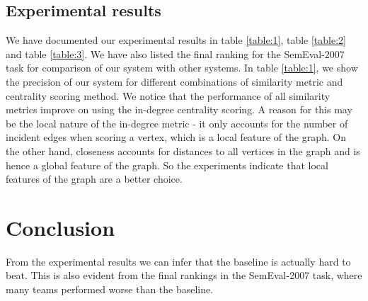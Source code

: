 \documentclass[12pt,letterpaper]{article}
\begin{document}
\subsection{Experimental results}
We have documented our experimental results in table \ref{table:1}, table \ref{table:2} and table \ref{table:3}. We have also listed the final ranking for the SemEval-2007 task for comparison of our system with other systems. In table \ref{table:1}, we show the precision of our system for different combinations of similarity metric and centrality scoring method. We notice that the performance of all similarity metrics improve on using the in-degree centrality scoring. A reason for this may be the local nature of the in-degree metric - it only accounts for the number of incident edges when scoring a vertex, which is a local feature of the graph. On the other hand, closeness accounts for distances to all vertices in the graph and is hence a global feature of the graph. So the experiments indicate that local features of the graph are a better choice.   


\section{Conclusion}
From the experimental results we can infer that the baseline is actually hard to beat. This is also evident from the final rankings in the SemEval-2007 task, where many teams performed worse than the baseline. 



  
\end{document}
